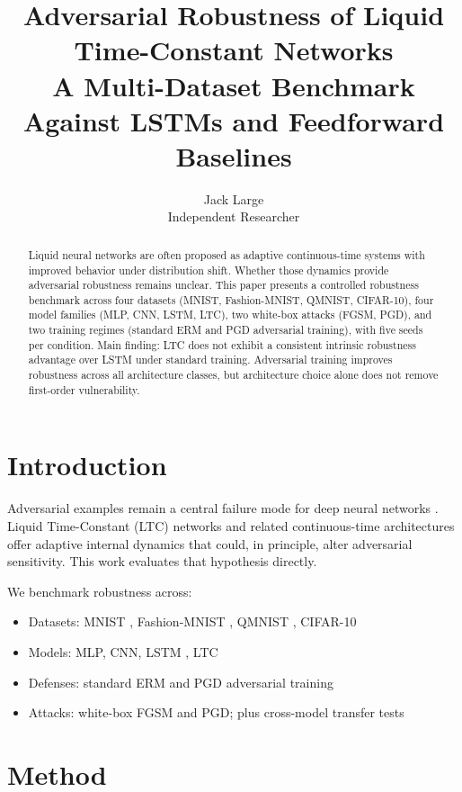 \documentclass[10pt,twocolumn]{article}
\title{\textbf{Adversarial Robustness of Liquid Time-Constant Networks}\\
\large A Multi-Dataset Benchmark Against LSTMs and Feedforward Baselines}
\author{Jack Large\\Independent Researcher}
\date{}
\begin{document}
\maketitle

\begin{abstract}
Liquid neural networks are often proposed as adaptive continuous-time systems with improved behavior under distribution shift. Whether those dynamics provide adversarial robustness remains unclear. This paper presents a controlled robustness benchmark across four datasets (MNIST, Fashion-MNIST, QMNIST, CIFAR-10), four model families (MLP, CNN, LSTM, LTC), two white-box attacks (FGSM, PGD), and two training regimes (standard ERM and PGD adversarial training), with five seeds per condition. Main finding: LTC does not exhibit a consistent intrinsic robustness advantage over LSTM under standard training. Adversarial training improves robustness across all architecture classes, but architecture choice alone does not remove first-order vulnerability.
\end{abstract}

\section{Introduction}
Adversarial examples remain a central failure mode for deep neural networks \citep{goodfellow2014fgsm,madry2017pgd}. Liquid Time-Constant (LTC) networks \citep{hasani2021ltc} and related continuous-time architectures \citep{lechner2020ncp,hasani2022cfc} offer adaptive internal dynamics that could, in principle, alter adversarial sensitivity. This work evaluates that hypothesis directly.

We benchmark robustness across:
\begin{itemize}
\item Datasets: MNIST \citep{lecun1998mnist}, Fashion-MNIST \citep{xiao2017fashionmnist}, QMNIST \citep{yadav2019qmnist}, CIFAR-10 \citep{krizhevsky2009cifar10}
\item Models: MLP, CNN, LSTM \citep{hochreiter1997lstm}, LTC \citep{hasani2021ltc}
\item Defenses: standard ERM and PGD adversarial training
\item Attacks: white-box FGSM and PGD; plus cross-model transfer tests \citep{papernot2016transferability}
\end{itemize}

\section{Method}
\end{document}
